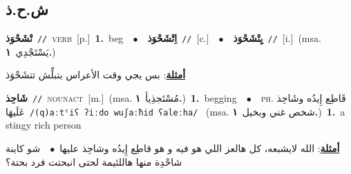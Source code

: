 \documentclass[10pt,a4paper,twoside]{article} %
\begin{document}
\begin{multicols}{2}
\vspace{-3mm}
\subsection*{\color{blue}\foreignlanguage{arabic}{ش.ح.ذ}\color{blue}{}} 

{\setlength\topsep{0pt}\textbf{\foreignlanguage{arabic}{تْشَحْوَذ}}\ {\color{gray}\texttt{//}\color{black}}\ \textsc{verb}\ [p.]\ \textbf{1.}~beg\ \ $\bullet$\ \ \setlength\topsep{0pt}\textbf{\foreignlanguage{arabic}{اِتْشَحْوَذ}}\ {\color{gray}\texttt{//}\color{black}}\ [c.]\ \ $\bullet$\ \ \setlength\topsep{0pt}\textbf{\foreignlanguage{arabic}{يِتْشَحْوَذ}}\ {\color{gray}\texttt{//}\color{black}}\ [i.]\ \color{gray}(msa. \foreignlanguage{arabic}{يَسْتَجْدِي}~\foreignlanguage{arabic}{\textbf{١.}})\color{black}\  \begin{flushright}\color{gray}\foreignlanguage{arabic}{\textbf{\underline{\foreignlanguage{arabic}{أمثلة}}}: بس يجي وقت الأعراس بتبلِّش تتشَحْوَذ}\end{flushright}\color{black}} \vspace{2mm}

{\setlength\topsep{0pt}\textbf{\foreignlanguage{arabic}{شَاحِذ}}\ {\color{gray}\texttt{//}\color{black}}\ \textsc{noun\textunderscore act}\ [m.]\ \color{gray}(msa. \foreignlanguage{arabic}{مُسْتَجذِيأ}~\foreignlanguage{arabic}{\textbf{١.}})\color{black}\ \textbf{1.}~begging\ \ $\bullet$\ \ \textsc{ph.} \color{gray} \foreignlanguage{arabic}{قَاطِع إِيدُه وشَاحِذ عَلَيهَا}\color{black}\ {\color{gray}\texttt{/{\sffamily (q)aːtˤiʕ ʔiːdo wuʃaːħid ʕaleːha}/}\color{black}}\ \color{gray} (msa. \foreignlanguage{arabic}{شخص غني وبخيل}~\foreignlanguage{arabic}{\textbf{١.}})\color{black}\ \textbf{1.}~a stingy rich person\  \begin{flushright}\color{gray}\foreignlanguage{arabic}{\textbf{\underline{\foreignlanguage{arabic}{أمثلة}}}: الله لايشبعه، كل هالعز اللي هو فيه و هو قاطِع إِيدُه وشاحِذ عليها\ $\bullet$\ \  شو كاينة شاحْدِة منها هاللئيمة لحتى انبحتت فرد بحتة؟}\end{flushright}\color{black}} \vspace{2mm}


\end{multicols}
\end{document}
